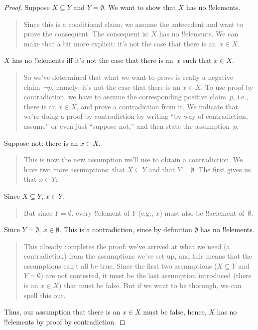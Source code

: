 \documentclass[../../../include/open-logic-section]{subfiles}
\begin{document}
\begin{proof}
  Suppose $X \subseteq Y$ and $Y = \emptyset$. We want to show that
  $X$ has no !!{element}s.
  \begin{quote}
    Since this is a conditional claim, we assume the antecedent and
    want to prove the consequent. The consequent is: $X$ has no
    !!{element}s. We can make that a bit more explicit: it's not the
    case that there is an~$x \in X$.
  \end{quote}
  $X$ has no !!{element}s iff it's not the case that there is an~$x$
  such that $x \in X$.
  \begin{quote}
    So we've determined that what we want to prove is really a
    negative claim~$\lnot p$, namely: it's not the case that there is
    an $x \in X$.  To use proof by contradiction, we have to assume the
    corresponding positive claim~$p$, i.e., there is an $x \in X$, and
    prove a contradiction from it.  We indicate that we're doing a
    proof by contradiction by writing ``by way
    of contradiction, assume'' or even just ``suppose not,'' and then state
    the assumption~$p$.
  \end{quote}
  Suppose not: there is an $x \in X$.
  \begin{quote}
    This is now the new assumption we'll use to obtain a
    contradiction. We have two more assumptions: that $X \subseteq Y$
    and that $Y = \emptyset$. The first gives us that $x \in Y$:
  \end{quote}
  Since $X \subseteq Y$, $x \in Y$.
  \begin{quote}
    But since $Y = \emptyset$, every !!{element} of $Y$ (e.g., $x$)
    must also be !!a{element} of~$\emptyset$.
  \end{quote}
  Since $Y = \emptyset$, $x \in \emptyset$. This is a contradiction,
  since by definition $\emptyset$ has no !!{element}s.
  \begin{quote}
    This already completes the proof: we've arrived at what we need (a
    contradiction) from the assumptions we've set up, and this means
    that the assumptions can't all be true. Since the first two
    assumptions ($X \subseteq Y$ and $Y = \emptyset$) are not
    contested, it must be the last assumption introduced (there is an
    $x \in X$) that must be false. But if we want to be thorough, we
    can spell this out.
  \end{quote}
  Thus, our assumption that there is an $x \in X$ must be false, hence,
  $X$ has no !!{element}s by proof by contradiction.
\end{proof}
\end{document}
